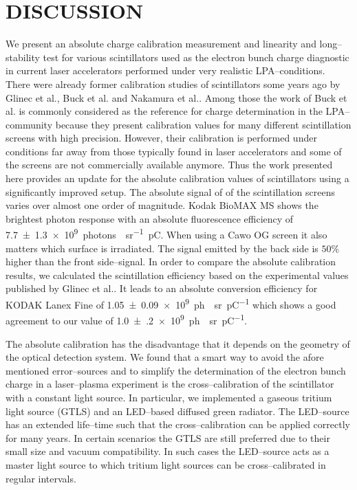 \documentclass[%
preprint,
amsmath,
amssymb,
aip,
rsi, 
numerical,
floatfix,
]{revtex4-1}
\newcommand{\myCite}[1]{\textcolor{blue}{\cite{#1}}}
\begin{document}
\section{\label{Cn} DISCUSSION}
We present an absolute charge calibration measurement and linearity and long--stability test for various scintillators used as the electron bunch charge diagnostic in current laser accelerators performed under very realistic LPA--conditions.
There were already former calibration studies of scintillators some years ago by Glinec et al.\myCite{Glinec2006}, Buck et al.\myCite{Buck2010} and Nakamura et al.\myCite{Nakamura2011}.
Among those the work of Buck et al.\myCite{Buck2010} is commonly considered as the reference for charge determination in the LPA--community because they present calibration values for many different scintillation screens with high precision.
However, their calibration is performed under conditions far away from those typically found in laser accelerators and some of the screens are not commercially available anymore.
Thus the work presented here provides an update for the absolute calibration values of scintillators using a significantly improved setup.
The absolute signal of of the scintillation screens varies over almost one order of magnitude.
Kodak BioMAX MS shows the brightest photon response with an absolute fluorescence efficiency of \SI[separate-uncertainty = true]{7.7(13)e9}{photons \per \per \steradian \pico \coulomb}.  
When using a Cawo OG screen it also matters which surface is irradiated.
The signal emitted by the back side is $50\%$ higher than the front side--signal.
In order to compare the absolute calibration results, we calculated the scintillation efficiency based on the experimental values published by Glinec et al.\myCite{Glinec2006}. 
It leads to an absolute conversion efficiency for KODAK Lanex Fine of \SI[separate-uncertainty = true]{1.05(9)e9}{ph \per \steradian \per \pico \coulomb} which shows a good agreement to our value of \SI[separate-uncertainty = true]{1.0(2)e9}{ph \per \steradian \per \pico \coulomb}.

The absolute calibration has the disadvantage that it depends on the geometry of the optical detection system. 
We found that a smart way to avoid the afore mentioned error--sources and to simplify the determination of the electron bunch charge in a laser--plasma experiment is the cross--calibration of the scintillator with a constant light source.
In particular, we implemented a gaseous tritium light source (GTLS) and an LED--based diffused green radiator.
The LED--source has an extended life--time such that the cross--calibration can be applied correctly for many years. 
In certain scenarios the GTLS are still preferred due to their small size and vacuum compatibility.
In such cases the LED--source acts as a master light source to which tritium light sources can be cross--calibrated in regular intervals.
\end{document}
